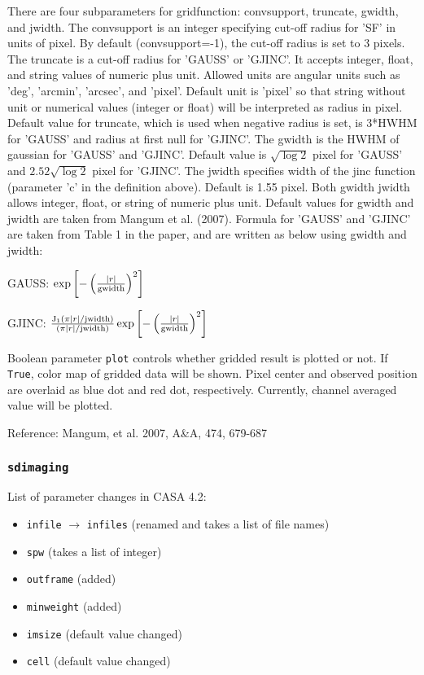 There are four subparameters for gridfunction: convsupport, truncate, 
gwidth, and jwidth. The convsupport is an integer specifying cut-off 
radius for 'SF' in units of pixel. By default (convsupport=-1), 
the cut-off radius is set to 3 pixels. The truncate is a cut-off 
radius for 'GAUSS' or 'GJINC'. It accepts integer, float, and 
string values of numeric plus unit. Allowed units are angular 
units such as 'deg', 'arcmin', 'arcsec', and 'pixel'. Default unit 
is 'pixel' so that string without unit or numerical values (integer 
or float) will be interpreted as radius in pixel. Default value 
for truncate, which is used when negative radius is set, is 3*HWHM 
for 'GAUSS' and radius at first null for 'GJINC'. The gwidth is 
the HWHM of gaussian for 'GAUSS' and 'GJINC'. Default value is 
$\sqrt{\log 2}$ pixel for 'GAUSS' and $2.52 \sqrt{\log 2}$ pixel for 
'GJINC'. The jwidth specifies width of the jinc function (parameter 
'c' in the definition above). Default is 1.55 pixel. Both gwidth 
jwidth allows integer, float, or string of numeric plus unit. 
Default values for gwidth and jwidth are taken from Mangum et al. 
(2007). Formula for 'GAUSS' and 'GJINC' are taken from Table 1 in 
the paper, and are written as below using gwidth and jwidth: 

   GAUSS: $ \exp \left[ - \left( \frac{|r|}{\rm gwidth} \right)^2 \right] $

   GJINC: $ \frac{ {\rm J}_1 \left( \pi |r| / {\rm jwidth} \right)}{\left( \pi |r| / {\rm jwidth} \right)} \exp \left[ - \left( \frac{|r|}{\rm gwidth} \right)^2 \right] $  


Boolean parameter {\tt plot} controls whether gridded result is plotted 
or not. If {\tt True}, color map of gridded data will be shown. Pixel 
center and observed position are overlaid as blue dot and red dot, 
respectively. Currently, channel averaged value will be plotted.

Reference: Mangum, et al. 2007, A\&A, 474, 679-687 


\subsubsection{{\tt sdimaging}}
\label{section:sd.sdtasks.tasks.sdimaging}

List of parameter changes in CASA 4.2:
\begin{itemize}
\item {\tt infile} $ \rightarrow $ {\tt infiles} (renamed and takes a list of file names)
\item {\tt spw} (takes a list of integer)
\item {\tt outframe} (added)
\item {\tt minweight} (added)
\item {\tt imsize} (default value changed)
\item {\tt cell} (default value changed)
\end{itemize}


